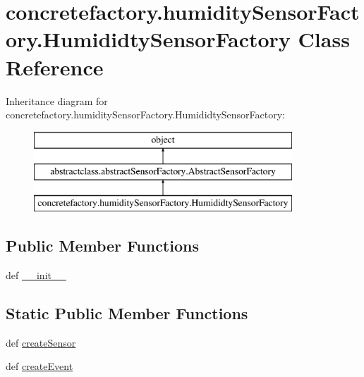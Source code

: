 \hypertarget{classconcretefactory_1_1humiditySensorFactory_1_1HumididtySensorFactory}{}\section{concretefactory.\+humidity\+Sensor\+Factory.\+Humididty\+Sensor\+Factory Class Reference}
\label{classconcretefactory_1_1humiditySensorFactory_1_1HumididtySensorFactory}
Inheritance diagram for concretefactory.\+humidity\+Sensor\+Factory.\+Humididty\+Sensor\+Factory\+:\begin{figure}[H]
\begin{center}
\leavevmode
\includegraphics[height=3.000000cm]{classconcretefactory_1_1humiditySensorFactory_1_1HumididtySensorFactory}
\end{center}
\end{figure}
\subsection*{Public Member Functions}
\begin{DoxyCompactItemize}
\item 
def \hyperlink{classconcretefactory_1_1humiditySensorFactory_1_1HumididtySensorFactory_a0ee7201fb44bfd9e4ca6e859704b9ebe}{\+\_\+\+\_\+init\+\_\+\+\_\+}
\end{DoxyCompactItemize}
\subsection*{Static Public Member Functions}
\begin{DoxyCompactItemize}
\item 
def \hyperlink{classconcretefactory_1_1humiditySensorFactory_1_1HumididtySensorFactory_a591e773357247fd00a760fa160d7b231}{create\+Sensor}
\item 
def \hyperlink{classconcretefactory_1_1humiditySensorFactory_1_1HumididtySensorFactory_a10fdfabd956a924a501a8bd9c07fc717}{create\+Event}
\end{DoxyCompactItemize}


